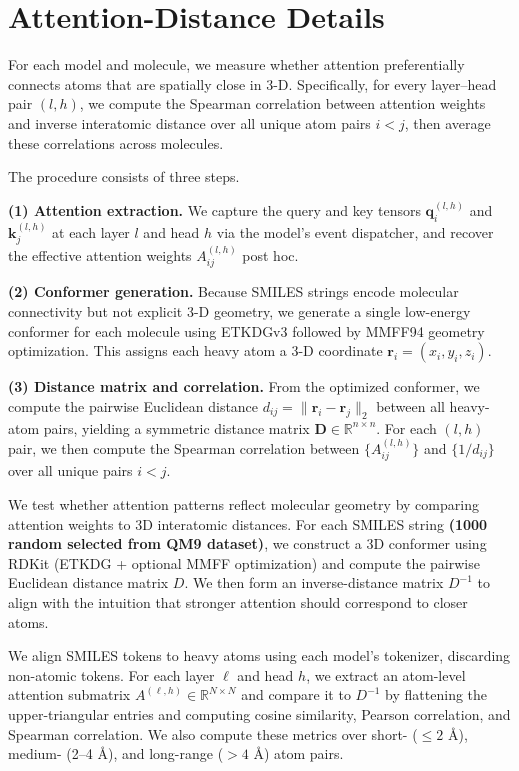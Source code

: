 \section{Attention-Distance Details}
\label{app:attention-details}

For each model and molecule, we measure whether attention
preferentially connects atoms that are spatially close in 3-D.
Specifically, for every layer--head pair $(l,h)$, we compute the
Spearman correlation between attention weights and inverse
interatomic distance over all unique atom pairs $i<j$,
then average these correlations across molecules.

The procedure consists of three steps.

\textbf{(1) Attention extraction.}
We capture the query and key tensors
$\mathbf{q}_i^{(l,h)}$ and $\mathbf{k}_j^{(l,h)}$
at each layer $l$ and head $h$ via the model's event dispatcher,
and recover the effective attention weights
$A_{ij}^{(l,h)}$ post hoc.

\textbf{(2) Conformer generation.}
Because SMILES strings encode molecular connectivity but not
explicit 3-D geometry, we generate a single low-energy conformer
for each molecule using ETKDGv3 followed by MMFF94 geometry
optimization. This assigns each heavy atom a 3-D coordinate
$\mathbf{r}_i=(x_i,y_i,z_i)$.

\textbf{(3) Distance matrix and correlation.}
From the optimized conformer, we compute the pairwise Euclidean
distance
$d_{ij}=\|\mathbf{r}_i-\mathbf{r}_j\|_2$
between all heavy-atom pairs, yielding a symmetric distance matrix
$\mathbf{D}\in\mathbb{R}^{n\times n}$.
For each $(l,h)$ pair, we then compute the Spearman correlation
between $\{A_{ij}^{(l,h)}\}$ and $\{1/d_{ij}\}$ over all unique
pairs $i<j$.

We test whether attention patterns reflect molecular geometry by comparing
attention weights to 3D interatomic distances. For each SMILES string \textbf{(1000 random selected from QM9 dataset)}, we construct
a 3D conformer using RDKit (ETKDG + optional MMFF optimization) and compute the
pairwise Euclidean distance matrix $D$. We then form an inverse-distance matrix
$D^{-1}$ to align with the intuition that stronger attention should correspond to
closer atoms.

We align SMILES tokens to heavy atoms using each model’s tokenizer, discarding
non-atomic tokens. For each layer $\ell$ and head $h$, we extract an atom-level
attention submatrix $A^{(\ell,h)} \in \mathbb{R}^{N \times N}$ and compare it to
$D^{-1}$ by flattening the upper-triangular entries and computing cosine similarity,
Pearson correlation, and Spearman correlation. We also compute these metrics over
short- ($\leq 2$ \AA), medium- (2–4 \AA), and long-range ($>4$ \AA) atom pairs.